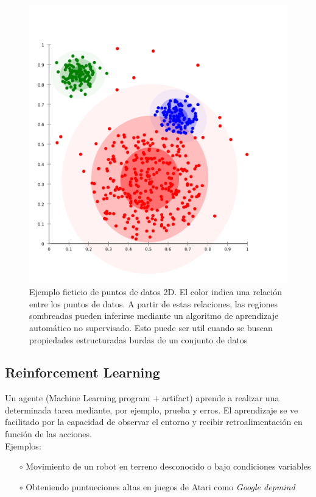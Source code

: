 \documentclass[12pt,a4paper]{book}
\begin{document}
\begin{figure}[hbtp]
\centering
\includegraphics[scale=0.35]{Graficas/cluster_example.png}
\caption{Ejemplo ficticio de puntos de datos 2D. El color indica una relación entre los puntos de datos. A partir de estas relaciones, las regiones sombreadas pueden inferirse mediante un algoritmo de aprendizaje automático no supervisado. Esto puede ser util cuando se buscan propiedades estructuradas burdas de un conjunto de datos}
\end{figure}
\subsection{Reinforcement Learning}
Un agente (Machine Learning program + artifact) aprende a realizar una determinada tarea mediante, por ejemplo, prueba y erros. El aprendizaje se ve facilitado por la capacidad de observar el entorno y recibir retroalimentación en función de las acciones.\\
Ejemplos:
\begin{enumerate}
 \item[$\circ$] Movimiento de un robot en terreno desconocido o bajo condiciones variables
 \item[$\circ$] Obteniendo puntueciones altas en juegos de Atari como \textsl{Google depmind}
\end{enumerate}
\end{document}
